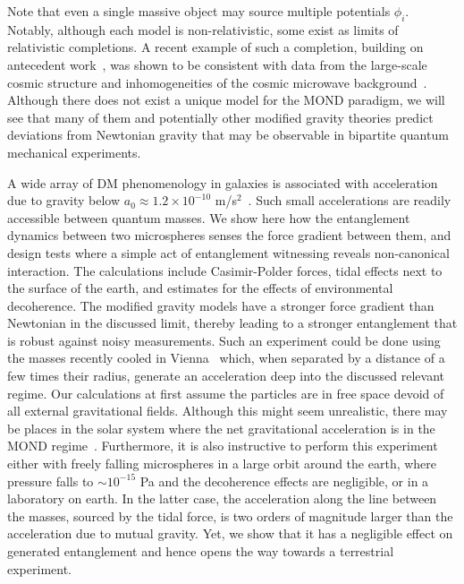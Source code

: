 \documentclass[aps,prd,reprint,superscriptaddress,nofootinbib,floatfix]{revtex4-2}
\begin{document}
Note that even a single massive object may source multiple potentials $\phi_{i}$.
Notably, although each model is non-relativistic, some exist as limits of relativistic completions. 
A recent example of such a completion, building on antecedent work~\cite{TeVeS-Bekenstein2004}, was shown to be consistent with data from the large-scale cosmic structure and inhomogeneities of the cosmic microwave background~\cite{RMOND-Zlosnik2021}.
Although there does not exist a unique model for the MOND paradigm, we will see that many of them and potentially other modified gravity theories predict deviations from Newtonian gravity that may be observable in bipartite quantum mechanical experiments.


A wide array of DM phenomenology in galaxies is associated with acceleration due to gravity below $a_0 \approx 1.2 \times 10^{-10}$ m/s$^2$~\cite{MOND-Milogram1983,MONDinMilkyWay-Famaey2005,MOND-Gentile2011}. 
Such small accelerations are readily accessible between quantum masses.
We show here how the entanglement dynamics between two microspheres senses the force gradient between them, and design tests where a simple act of entanglement witnessing reveals non-canonical interaction. 
The calculations include Casimir-Polder forces, tidal effects next to the surface of the earth, and estimates for the effects of environmental decoherence.
The modified gravity models have a stronger force gradient than Newtonian in the discussed limit, thereby leading to a stronger entanglement that is robust against noisy measurements.
Such an experiment could be done using the masses recently cooled in Vienna~\cite{Sciene-Aspelmeyer2020} which, when separated by a distance of a few times their radius, generate an acceleration deep into the discussed relevant regime.
Our calculations at first assume the particles are in free space devoid of all external gravitational fields.
Although this might seem unrealistic, there may be places in the solar system where the net gravitational acceleration is in the MOND regime~\cite{MOND-Bekenstein2006,MOND-LISA-Magueijo2012}.
Furthermore, it is also instructive to perform this experiment either with freely falling microspheres in a large orbit around the earth, where pressure falls to $\sim 10^{-15}$ Pa and the decoherence effects are negligible, or in a laboratory on earth. In the latter case, the acceleration along the line between the masses, sourced by the tidal force, is two orders of magnitude larger than the acceleration due to mutual gravity. Yet, we show that it has a negligible effect on generated entanglement and hence opens the way towards a terrestrial experiment.
\end{document}
